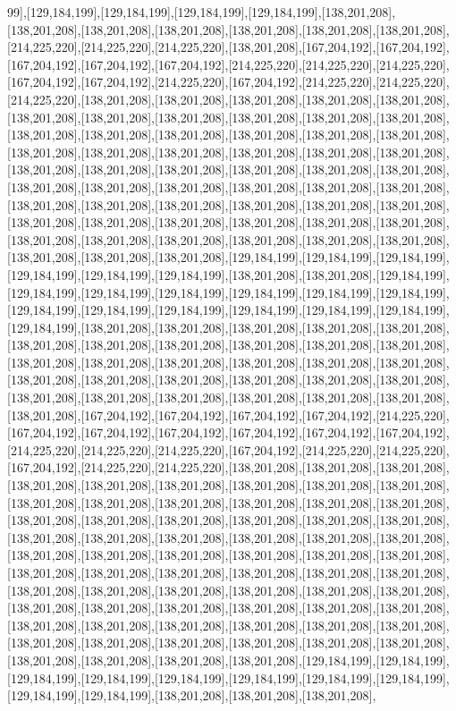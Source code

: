 99],[129,184,199],[129,184,199],[129,184,199],[129,184,199],[138,201,208],[138,201,208],[138,201,208],[138,201,208],[138,201,208],[138,201,208],[138,201,208],[214,225,220],[214,225,220],[214,225,220],[138,201,208],[167,204,192],[167,204,192],[167,204,192],[167,204,192],[167,204,192],[214,225,220],[214,225,220],[214,225,220],[167,204,192],[167,204,192],[214,225,220],[167,204,192],[214,225,220],[214,225,220],[214,225,220],[138,201,208],[138,201,208],[138,201,208],[138,201,208],[138,201,208],[138,201,208],[138,201,208],[138,201,208],[138,201,208],[138,201,208],[138,201,208],[138,201,208],[138,201,208],[138,201,208],[138,201,208],[138,201,208],[138,201,208],[138,201,208],[138,201,208],[138,201,208],[138,201,208],[138,201,208],[138,201,208],[138,201,208],[138,201,208],[138,201,208],[138,201,208],[138,201,208],[138,201,208],[138,201,208],[138,201,208],[138,201,208],[138,201,208],[138,201,208],[138,201,208],[138,201,208],[138,201,208],[138,201,208],[138,201,208],[138,201,208],[138,201,208],[138,201,208],[138,201,208],[138,201,208],[138,201,208],[138,201,208],[138,201,208],[138,201,208],[138,201,208],[138,201,208],[138,201,208],[138,201,208],[138,201,208],[138,201,208],[138,201,208],[138,201,208],[129,184,199],[129,184,199],[129,184,199],[129,184,199],[129,184,199],[129,184,199],[138,201,208],[138,201,208],[129,184,199],[129,184,199],[129,184,199],[129,184,199],[129,184,199],[129,184,199],[129,184,199],[129,184,199],[129,184,199],[129,184,199],[129,184,199],[129,184,199],[129,184,199],[129,184,199],[138,201,208],[138,201,208],[138,201,208],[138,201,208],[138,201,208],[138,201,208],[138,201,208],[138,201,208],[138,201,208],[138,201,208],[138,201,208],[138,201,208],[138,201,208],[138,201,208],[138,201,208],[138,201,208],[138,201,208],[138,201,208],[138,201,208],[138,201,208],[138,201,208],[138,201,208],[138,201,208],[138,201,208],[138,201,208],[138,201,208],[138,201,208],[138,201,208],[138,201,208],[138,201,208],[167,204,192],[167,204,192],[167,204,192],[167,204,192],[214,225,220],[167,204,192],[167,204,192],[167,204,192],[167,204,192],[167,204,192],[167,204,192],[214,225,220],[214,225,220],[214,225,220],[167,204,192],[214,225,220],[214,225,220],[167,204,192],[214,225,220],[214,225,220],[138,201,208],[138,201,208],[138,201,208],[138,201,208],[138,201,208],[138,201,208],[138,201,208],[138,201,208],[138,201,208],[138,201,208],[138,201,208],[138,201,208],[138,201,208],[138,201,208],[138,201,208],[138,201,208],[138,201,208],[138,201,208],[138,201,208],[138,201,208],[138,201,208],[138,201,208],[138,201,208],[138,201,208],[138,201,208],[138,201,208],[138,201,208],[138,201,208],[138,201,208],[138,201,208],[138,201,208],[138,201,208],[138,201,208],[138,201,208],[138,201,208],[138,201,208],[138,201,208],[138,201,208],[138,201,208],[138,201,208],[138,201,208],[138,201,208],[138,201,208],[138,201,208],[138,201,208],[138,201,208],[138,201,208],[138,201,208],[138,201,208],[138,201,208],[138,201,208],[138,201,208],[138,201,208],[138,201,208],[138,201,208],[138,201,208],[138,201,208],[138,201,208],[138,201,208],[138,201,208],[138,201,208],[138,201,208],[138,201,208],[138,201,208],[138,201,208],[138,201,208],[138,201,208],[129,184,199],[129,184,199],[129,184,199],[129,184,199],[129,184,199],[129,184,199],[129,184,199],[129,184,199],[129,184,199],[129,184,199],[138,201,208],[138,201,208],[138,201,208],